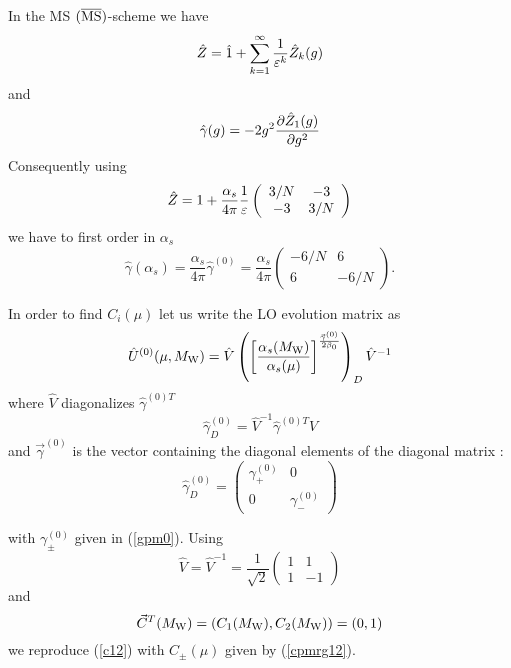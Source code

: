 \documentclass[12pt]{article}
\def\eps{\varepsilon}
\def\as{\alpha_s}
\newcommand{\mw}{M_{\rm W}}
\newcommand{\be}{\begin{equation}}
\newcommand{\ee}{\end{equation}}
\def\aspi{\frac{\as}{4\pi}}
\begin{document}
\begin{itemize}
\begin{itemize}
\begin{itemize}
In the MS $(\overline{\rm MS})$-scheme we have
\begin{equation}\label{ziem}
\hat Z=\hat 1+\sum^\infty_{k=1} {1\over \eps^k} \hat Z_{k}(g)  
\end{equation}
and 
\begin{equation}\label{zi1m}
\hat\gamma(g)=-2 g^2{\partial \hat Z_{1}(g)\over\partial g^2}
\end{equation}
Consequently using
\begin{equation}\label{zll0} \hat Z = 1+ \aspi {1\over\eps}
 \left(\begin{array}{cc}  3/N & -3 \\
                          -3 & 3/N
    \end{array}\right)   \end{equation}
we have to first order in $\as$ \cite{MAIANI}
\begin{equation}\label{g120} \hat\gamma(\as)=\aspi \hat\gamma^{(0)}=\aspi
 \left(\begin{array}{cc} -6/N & 6 \\
                          6 & -6/N
    \end{array}\right).   \end{equation}

In order to find $C_i(\mu)$  let us write the LO evolution matrix
as
\begin{equation}\label{u0vd0} 
\hat U^{(0)}(\mu,\mw)= \hat V
\left({\left[{\as(\mw)\over\as(\mu)}
\right]}^{{\vec\gamma^{(0)}\over 2\beta_0}}
   \right)_D \hat V^{-1}   \end{equation}
where $\hat V$ diagonalizes ${\hat\gamma^{(0)T}}$
\begin{equation}\label{ga0d} 
\hat\gamma^{(0)}_D=\hat V^{-1} {\hat\gamma^{(0)T}} \hat V
  \end{equation}
and $\vec\gamma^{(0)}$ is the vector containing the diagonal elements of
the diagonal matrix :
\begin{equation}\label{g120d} \hat\gamma^{(0)}_D=
 \left(\begin{array}{cc} \gamma^{(0)}_+ & 0 \\
                          0 & \gamma^{(0)}_-
    \end{array}\right)   \end{equation}

with $\gamma^{(0)}_\pm$ given in (\ref{gpm0}). Using
\be
\hat V = \hat V^{-1} =\frac{1}{\sqrt{2}}
\left(\begin{array}{cc} 1  & 1 \\
                          1 & -1
    \end{array}\right)   \end{equation}
and
\be
\vec C^T(\mw)=(C_1(\mw), C_2(\mw))=(0,1)
\ee
we reproduce (\ref{c12}) with $C_\pm(\mu)$ given by (\ref{cpmrg12}).


\end{itemize}
\end{itemize}
\end{itemize}
\end{document}
